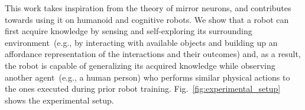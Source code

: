 This work takes inspiration from the theory of mirror neurons, and contributes towards using it on humanoid and cognitive robots. We show that a robot can first acquire knowledge by sensing and self-exploring its surrounding environment~(e.g., by interacting with available objects and building up an affordance representation of the interactions and their outcomes) and, as a result, the robot is capable of generalizing its acquired knowledge while observing another agent~(e.g., a human person) who performs similar physical actions to the ones executed during prior robot training. Fig.~\ref{fig:experimental_setup} shows the experimental setup.
